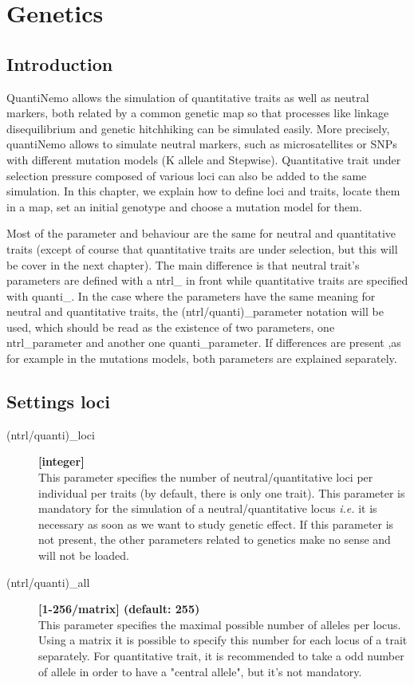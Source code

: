 \documentclass[letterpaper,12pt,oneside]{book}
\begin{document}
\chapter{Genetics}\label{chap:Genetics}
\section{Introduction}
QuantiNemo allows the simulation of quantitative traits as well as neutral markers, both related by a common genetic map so that processes like linkage disequilibrium and genetic hitchhiking can be simulated easily. More precisely, quantiNemo allows to simulate neutral markers, such as microsatellites or SNPs with different mutation models (K allele and Stepwise). Quantitative trait under selection pressure composed of various loci can also be added to the same simulation. In this chapter, we explain how to define loci and traits, locate them in a map, set an initial genotype and choose a mutation model for them.

Most of the parameter and behaviour are the same for neutral and quantitative traits (except of course that quantitative traits are under selection, but this will be cover in the next chapter). The main difference is that neutral trait's parameters are defined with a \textsf{ntrl\_} in front while quantitative traits are specified with  \textsf{quanti\_}. In the case where the parameters have the same meaning for neutral and quantitative traits, the \textsf{(ntrl/quanti)\_parameter} notation will be used, which should be read as the existence of two parameters, one \textsf{ntrl\_parameter} and another one \textsf{quanti\_parameter}. If differences are present  ,as for example in the mutations models, both parameters are explained separately. 
\section{Settings loci}
\label{sec:SettingsLoci}
\begin{description}
\item[(ntrl/quanti)\_loci] \textbf{[integer]}\\
This parameter specifies the number of neutral/quantitative loci per individual per traits (by default, there is only one trait). This parameter is mandatory for the simulation of a neutral/quantitative locus \textit{i.e.} it is necessary as soon as we want to study genetic effect. If this parameter is not present, the other parameters related to genetics make no sense and will not be loaded. 

\item[(ntrl/quanti)\_all] \textbf{[1-256/matrix] (default: 255)}\\
This parameter specifies the maximal possible number of alleles per locus. Using a matrix it is possible to specify this number for each locus of a trait separately. For quantitative trait, it is recommended to take a odd number of allele in order to have a "central allele", but it's not mandatory. 
\end{description}
\end{document}
